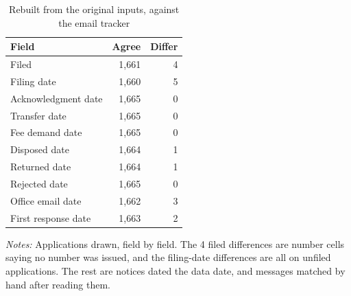 \begin{table}[!htbp]
\centering
\caption{Rebuilt from the original inputs, against the email tracker}
\label{tab:tab_validation}
\small
\begin{threeparttable}
\begin{tabular}{lrr}
\toprule
Field & Agree & Differ \\
\midrule
Filed & 1,661 & 4 \\
Filing date & 1,660 & 5 \\
Acknowledgment date & 1,665 & 0 \\
Transfer date & 1,665 & 0 \\
Fee demand date & 1,665 & 0 \\
Disposed date & 1,664 & 1 \\
Returned date & 1,664 & 1 \\
Rejected date & 1,665 & 0 \\
Office email date & 1,662 & 3 \\
First response date & 1,663 & 2 \\
\bottomrule
\end{tabular}
\begin{tablenotes}[flushleft]\footnotesize
\item \textit{Notes:} Applications drawn, field by field. The 4 filed differences are number cells saying no number was issued, and the filing-date differences are all on unfiled applications. The rest are notices dated the data date, and messages matched by hand after reading them.
\end{tablenotes}
\end{threeparttable}
\end{table}
